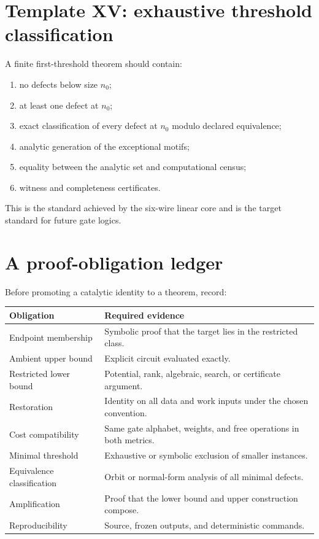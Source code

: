 \section{Template XV: exhaustive threshold classification}
A finite first-threshold theorem should contain:
\begin{enumerate}
\item no defects below size $n_0$;
\item at least one defect at $n_0$;
\item exact classification of every defect at $n_0$ modulo declared equivalence;
\item analytic generation of the exceptional motifs;
\item equality between the analytic set and computational census;
\item witness and completeness certificates.
\end{enumerate}
This is the standard achieved by the six-wire linear core and is the target standard for future gate logics.

\section{A proof-obligation ledger}
Before promoting a catalytic identity to a theorem, record:
\begin{longtable}{@{}p{}p{}@{}}
\toprule
Obligation & Required evidence\\
\midrule
Endpoint membership & Symbolic proof that the target lies in the restricted class.\\
Ambient upper bound & Explicit circuit evaluated exactly.\\
Restricted lower bound & Potential, rank, algebraic, search, or certificate argument.\\
Restoration & Identity on all data and work inputs under the chosen convention.\\
Cost compatibility & Same gate alphabet, weights, and free operations in both metrics.\\
Minimal threshold & Exhaustive or symbolic exclusion of smaller instances.\\
Equivalence classification & Orbit or normal-form analysis of all minimal defects.\\
Amplification & Proof that the lower bound and upper construction compose.\\
Reproducibility & Source, frozen outputs, and deterministic commands.\\
\bottomrule
\end{longtable}
